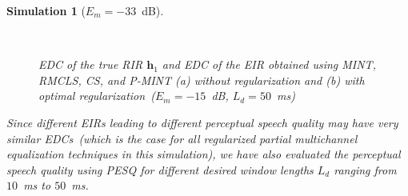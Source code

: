 \documentclass[10pt]{IEEEtran}
\newtheorem{simulation}{Simulation}
\begin{document}
\begin{simulation}[$E_m=-33$~dB]
\begin{figure}[t!]
\centering
\hbox{
}
\caption{EDC of the true RIR $\mathbf{h}_1$ and EDC of the EIR obtained using MINT, RMCLS, CS, and P-MINT (a) without regularization and (b) with optimal regularization~($E_m = -15$~dB, $L_d = 50$~ms)}
\end{figure}
Since different EIRs leading to different perceptual speech quality may have very similar EDCs~(which is the case for all regularized partial multichannel equalization techniques in this simulation), we have also evaluated the perceptual speech quality using PESQ for different desired window lengths $L_d$ ranging from $10$~ms to $50$~ms.

\end{simulation}
\end{document}
